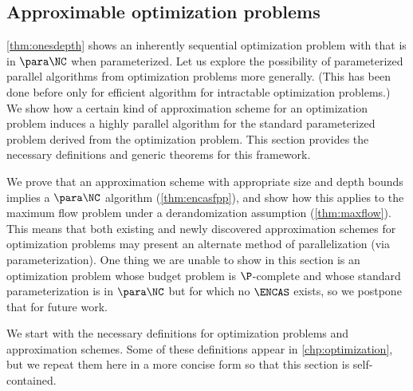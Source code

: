 \subsection{Approximable optimization problems}

%
%
%
\autoref{thm:onesdepth} shows an inherently sequential optimization problem with that is in $\para \NC$ when parameterized.
%
%
%
Let us explore the possibility of parameterized parallel algorithms from optimization problems more generally.
(This has been done before only for efficient algorithm for intractable optimization problems.)
%
%
%
We show how a certain kind of approximation scheme for an optimization problem induces a highly parallel algorithm for the standard parameterized problem derived from the optimization problem.
%
%
%
This section provides the necessary definitions and generic theorems for this framework.
%

%
%
%
We prove that an approximation scheme with appropriate size and depth bounds implies a $\para \NC$ algorithm (\autoref{thm:encasfpp}), and show how this applies to the maximum flow problem under a derandomization assumption (\autoref{thm:maxflow}).
%
%
%
This means that both existing and newly discovered approximation schemes for optimization problems may present an alternate method of parallelization (via parameterization).
%
%
One thing we are unable to show in this section is an optimization problem whose budget problem is $\P$-complete and whose standard parameterization is in $\para \NC$ but for which no $\ENCAS$ exists, so we postpone that for future work.


We start with the necessary definitions for optimization problems and approximation schemes.
Some of these definitions appear in \autoref{chp:optimization}, but we repeat them here in a more concise form so that this section is self-contained.

